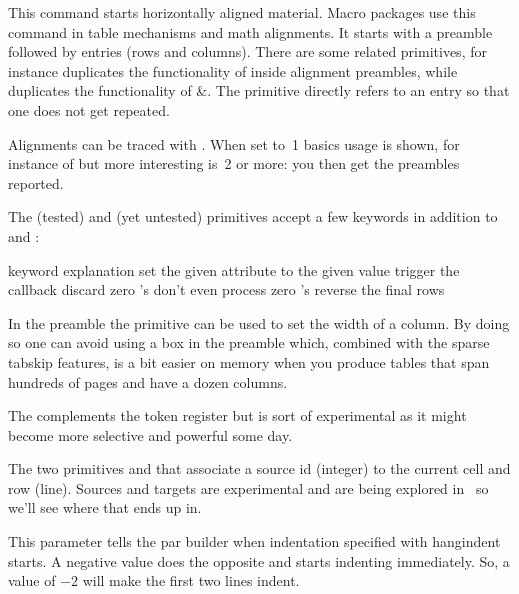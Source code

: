 This command starts horizontally aligned material. Macro packages use this
command in table mechanisms and math alignments. It starts with a preamble
followed by entries (rows and columns). There are some related primitives, for
instance  duplicates the functionality of \type {#} inside
alignment preambles, while  duplicates the functionality of \type
{&}. The  primitive directly refers to an entry so that one
does not get repeated.

Alignments can be traced with . When set to~1 basics
usage is shown, for instance of  but more interesting is~2 or more:
you then get the preambles reported.

The  (tested) and  (yet untested) primitives accept a
few keywords in addition to  and :

\starttabulate[|l|p|]
\FL
\BC keyword          \BC explanation \NC \NR
\TL
\NC {}     \NC set the given attribute to the given value \NC \NR
\NC {} \NC trigger the  callback \NC \NR
\NC {}  \NC discard zero 's \NC \NR
\NC {}  \NC don't even process zero 's \NC \NR
\NC {}  \NC reverse the final rows \NC \NR
\LL
\stoptabulate

In the preamble the  primitive can be used to set the width of a
column. By doing so one can avoid using a box in the preamble which, combined
with the sparse tabskip features, is a bit easier on memory when you produce
tables that span hundreds of pages and have a dozen columns.

The  complements the  token register but is sort of
experimental as it might become more selective and powerful some day.

The two primitives  and  that
associate a source id (integer) to the current cell and row (line). Sources and
targets are experimental and are being explored in \CONTEXT\ so we'll see where
that ends up in.

\stopoldprimitive

\startoldprimitive[title={\prm {hangafter}}]

This parameter tells the par builder when indentation specified with \prm
{hangindent} starts. A negative value does the opposite and starts indenting
immediately. So, a value of $-2$ will make the first two lines indent.

